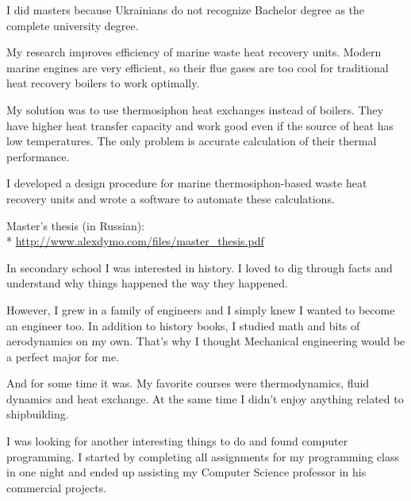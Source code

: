 \documentclass[12pt]{letter}
\begin{document}
\begin{llist}
  \startexperience

            \item I did masters because Ukrainians do not recognize Bachelor degree as the complete university degree.

            \item My research improves efficiency of marine waste heat recovery units. Modern marine engines are very efficient, so their flue gases are too cool for traditional heat recovery boilers to work optimally.

            \item My solution was to use thermosiphon heat exchanges instead of boilers. They have higher heat transfer capacity and work good even if the source of heat has low temperatures. The only problem is accurate calculation of their thermal performance.

            \item I developed a design procedure for marine thermosiphon-based waste heat recovery units and wrote a software to automate these calculations.

            \item Master's thesis (in Russian):\\*
            \url{http://www.alexdymo.com/files/master_thesis.pdf}

  \endexperience


  \startexperience

            \item In secondary school I was interested in history. I loved to dig through facts and understand why things happened the way they happened.

            \item However, I grew in a family of engineers and I simply knew I wanted to become an engineer too. In addition to history books, I studied math and bits of aerodynamics on my own. That's why I thought Mechanical engineering would be a perfect major for me.

            \item And for some time it was. My favorite courses were thermodynamics, fluid dynamics and heat exchange. At the same time I didn't enjoy anything related to shipbuilding.

            \item I was looking for another interesting things to do and found computer programming. I started by completing all assignments for my programming class in one night and ended up assisting my Computer Science professor in his commercial projects.

  \endexperience

\end{llist}
\end{document}
